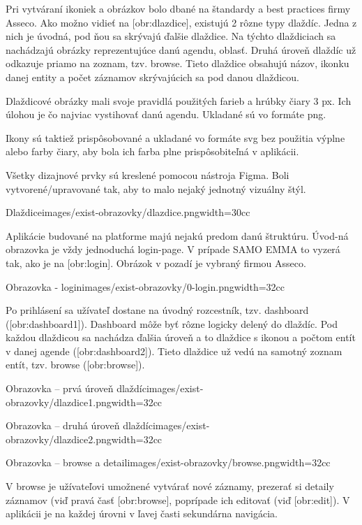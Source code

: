 Pri vytváraní ikoniek a obrázkov bolo dbané na štandardy a best practices firmy Asseco. Ako možno vidieť na [obr:dlazdice], existujú 2 rôzne typy dlaždíc. Jedna z nich je úvodná, pod ňou sa skrývajú ďalšie dlaždice. Na týchto dlaždiciach sa nachádzajú obrázky reprezentujúce danú agendu, oblasť. Druhá úroveň dlaždíc už odkazuje priamo na zoznam, tzv. browse. Tieto dlaždice obsahujú názov, ikonku danej entity a počet záznamov skrývajúcich sa pod danou dlaždicou. 

Dlaždicové obrázky mali svoje pravidlá použitých farieb a hrúbky čiary 3 px. Ich úlohou je čo najviac vystihovať danú agendu. Ukladané sú vo formáte png. 

Ikony sú taktiež prispôsobované a ukladané vo formáte svg bez použitia výplne alebo farby čiary, aby bola ich farba plne prispôsobiteľná v aplikácii. 

Všetky dizajnové prvky sú kreslené pomocou nástroja Figma. Boli vytvorené/upravované tak, aby to malo nejaký jednotný vizuálny štýl. 

{Dlaždice}{images/exist-obrazovky/dlazdice.png}{width=30cc} 

Aplikácie budované na platforme majú nejakú predom danú štruktúru.  Úvod-ná obrazovka je vždy jednoduchá login-page. V prípade SAMO EMMA to vyzerá tak, ako je na [obr:login]. Obrázok v pozadí je vybraný firmou Asseco.

{Obrazovka - login}{images/exist-obrazovky/0-login.png}{width=32cc} 

Po prihlásení sa užívateľ dostane na úvodný rozcestník, tzv. dashboard ([obr:dashboard1]). Dashboard môže byť rôzne logicky delený do dlaždíc. Pod každou dlaždicou sa nachádza ďalšia úroveň a to dlaždice s ikonou a počtom entít v danej agende ([obr:dashboard2]). Tieto dlaždice už vedú na samotný zoznam entít, tzv. browse ([obr:browse]).

{Obrazovka -- prvá úroveň dlaždíc}{images/exist-obrazovky/dlazdice1.png}{width=32cc} 

{Obrazovka -- druhá úroveň dlaždíc}{images/exist-obrazovky/dlazdice2.png}{width=32cc} 

{Obrazovka -- browse a detail}{images/exist-obrazovky/browse.png}{width=32cc} 

V browse je užívateľovi umožnené vytvárať nové záznamy, prezerať si detaily záznamov (viď pravá časť [obr:browse], poprípade ich editovať (viď [obr:edit]). V aplikácii je na každej úrovni v ľavej časti sekundárna navigácia.


